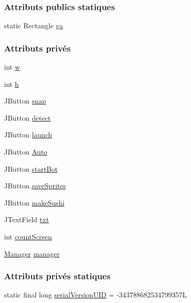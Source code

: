 \subsubsection*{Attributs publics statiques}
\begin{DoxyCompactItemize}
\item 
static Rectangle \hyperlink{classSushis_1_1src_1_1ToolBox_a614f944df0493f7be8fcdad36d3265b7}{ga}
\end{DoxyCompactItemize}
\subsubsection*{Attributs privés}
\begin{DoxyCompactItemize}
\item 
int \hyperlink{classSushis_1_1src_1_1ToolBox_a689f8c81667d4670ff2d02aa7ae20242}{w}
\item 
int \hyperlink{classSushis_1_1src_1_1ToolBox_a8a0634e76ab0c36a2680aadc4804d61f}{h}
\item 
J\+Button \hyperlink{classSushis_1_1src_1_1ToolBox_a92f658b366053fcd6cc3500bc120bccf}{snap}
\item 
J\+Button \hyperlink{classSushis_1_1src_1_1ToolBox_a97915cb5b53d45698008fdceaca88f39}{detect}
\item 
J\+Button \hyperlink{classSushis_1_1src_1_1ToolBox_ac2b0f3f785735afdec44dbc9b63c2ad8}{launch}
\item 
J\+Button \hyperlink{classSushis_1_1src_1_1ToolBox_a334c8b8a5095b846d19f95613f52b56a}{Auto}
\item 
J\+Button \hyperlink{classSushis_1_1src_1_1ToolBox_a51e8839587c8937425701cce8a1eb542}{start\+Bot}
\item 
J\+Button \hyperlink{classSushis_1_1src_1_1ToolBox_adffa45cac603153f119c3823b91d04a2}{save\+Sprites}
\item 
J\+Button \hyperlink{classSushis_1_1src_1_1ToolBox_acfd0e9f96879bd5b8f709e77678a2275}{make\+Sushi}
\item 
J\+Text\+Field \hyperlink{classSushis_1_1src_1_1ToolBox_ad0a7dea17f66a3ce47f294007f85ade8}{txt}
\item 
int \hyperlink{classSushis_1_1src_1_1ToolBox_a90d171e07ac8f4035084009d2fffb3c0}{count\+Screen}
\item 
\hyperlink{classSushis_1_1src_1_1Manager}{Manager} \hyperlink{classSushis_1_1src_1_1ToolBox_a674ad641135509e9c449f116a452ce0b}{manager}
\end{DoxyCompactItemize}
\subsubsection*{Attributs privés statiques}
\begin{DoxyCompactItemize}
\item 
static final long \hyperlink{classSushis_1_1src_1_1ToolBox_a3cbb82ca28dd3010b987cfb5b04c7819}{serial\+Version\+U\+I\+D} = -\/343788682534799357\+L
\end{DoxyCompactItemize}


